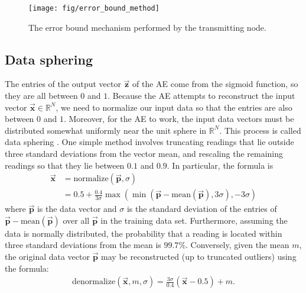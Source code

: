 \documentclass[a4paper,onecolumn,conference]{IEEEtran}
\begin{document}
\begin{figure}
\begin{centering}
\texttt{[image: fig/error\_bound\_method]}
\par\end{centering}

\caption{\label{fig:error_bound}The error bound mechanism performed by the transmitting node.}
\end{figure}

\subsection{Data sphering}
The entries of the output vector $\vec{\mathbf{z}}$ of the AE come from the sigmoid function, so they are all between $0$ and $1$. Because the AE attempts to reconstruct the input vector $\vec{\mathbf{x}} \in \mathbb{R}^N$, we need to normalize our input data so that the entries are also between $0$ and $1$. Moreover, for the AE to work, the input data vectors must be distributed somewhat uniformly near the unit sphere in $\mathbb{R}^{N}$. This process is called data sphering \cite{ng2011sparse}. One simple method involves truncating readings that lie outside three standard deviations from the vector mean, and rescaling the remaining readings so that they lie between $0.1$ and $0.9$. In particular, the formula is
\begin{equation} \label{eq:truncation}
\begin{split}
\vec{\mathbf{x}} & = \text{normalize}(\vec{\mathbf{p}},\sigma) \\
	&= 0.5 + \frac{0.4}{3\sigma} \max\left(\min\left(\vec{\mathbf{p}}-\text{mean}(\vec{\mathbf{p}}),3\sigma\right),-3\sigma\right)
\end{split}
\end{equation}
where $\vec{\mathbf{p}}$ is the data vector and $\sigma$ is the standard deviation of the entries of $\vec{\mathbf{p}}-\text{mean}(\vec{\mathbf{p}})$ over all $\vec{\mathbf{p}}$ in the training data set. Furthermore, assuming the data is normally distributed, the probability that a reading is located within three standard deviations from the mean is $99.7\%$. Conversely, given the mean $m$, the original data vector $\vec{\mathbf{p}}$ may be reconstructed (up to truncated outliers) using the formula:
\begin{equation} \label{eq:detruncation}
\begin{split}
\text{denormalize}(\vec{\mathbf{x}},m,\sigma) = \frac{3\sigma}{0.4} (\vec{\mathbf{x}}-0.5)+m.
\end{split}
\end{equation}
\end{document}
